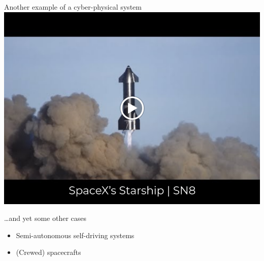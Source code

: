 \documentclass{beamer}
\begin{document}
\begin{frame}{Another example of a cyber-physical system}
  \centering
  \href{https://www.youtube.com/watch?v=_qwLHlVjRyw&t=82s}{
    \includegraphics[scale=0.3]{Images/shuttle.png}
  }
\end{frame}

\begin{frame}{\dots and yet some other cases}
        \begin{itemize}
                \item Semi-autonomous self-driving systems
                \item (Crewed) spacecrafts
        \end{itemize}
\end{frame}
\end{document}
